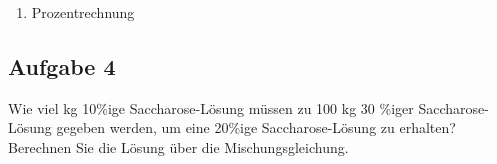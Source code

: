\documentclass[a4paper,11pt]{article}
\newif\ifshowme
\begin{document}
\begin{enumerate}[label=\alph*)]
\item Prozentrechnung
\ifshowme
\antwort{
\begin{align*}
1200~\text{g} \cdot \frac{24}{60} &= 480~\text{g} \\
1200~\text{g} \cdot \frac{36}{60} &= 720 ~\text{g}
\end{align*}
}
\else
\fi

\end{enumerate}

\subsection*{Aufgabe 4}
Wie viel kg 10\%ige Saccharose-Lösung müssen zu 100 kg 30 \%iger Saccharose-Lösung
gegeben werden, um eine 20\%ige Saccharose-Lösung zu erhalten? Berechnen Sie die Lösung
über die Mischungsgleichung.

\ifshowme
\antwort{

Mit: $x_1 = 10\% $ ; $x_2 = 20\%$ ; $x_3 = 30\% $ ; $m_1 = ? $ ; $m_2 = m_3 + m_1$ ; $m_3 = 100$ 
\begin{align*}
m_3x_3 + m_1x_1 			&= m_3x_2 + m_1x_2 \\
m_3x_3 + m_1x_1 - m_1x_2 	&= m_3x_2 \\
m_1x_1 - m_1x_2 			&= m_3x_2 - m_3x_3 \\
m_1(x_1 - x_2) 				&= m_3(x_2-x_3) \\
m_1 						&= \frac{m_3(x_2-x_3)}{x_1 - x_2} \\
m_1 						&= \frac{100(0,2-0,3)}{0,1 - 0,2} \\
&= 100
\end{align*}
}
\pagebreak
\else
\fi
\end{document}
